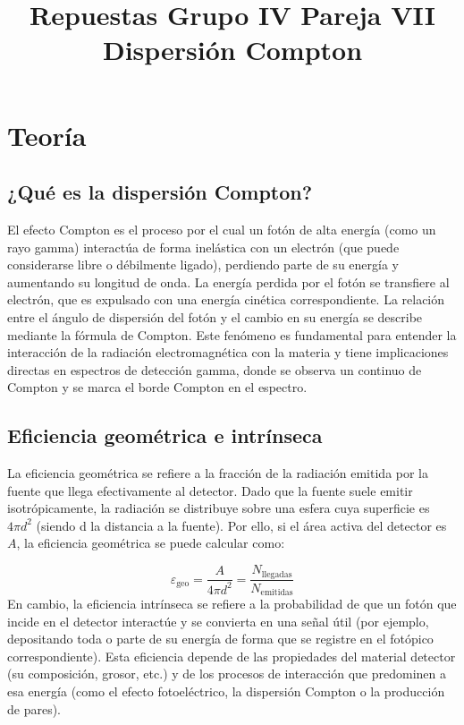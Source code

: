 \documentclass[11pt]{article}
\title{Repuestas Grupo IV Pareja VII Dispersión Compton}
\begin{document}
	
\maketitle
\tableofcontents

\setlength{\parskip}{1.5mm} %

\newpage




\section{Teoría}

\subsection{¿Qué es la dispersión Compton?}

El efecto Compton es el proceso por el cual un fotón de alta energía (como un rayo gamma) interactúa de forma inelástica con un electrón (que puede considerarse libre o débilmente ligado), perdiendo parte de su energía y aumentando su longitud de onda. La energía perdida por el fotón se transfiere al electrón, que es expulsado con una energía cinética correspondiente. La relación entre el ángulo de dispersión del fotón y el cambio en su energía se describe mediante la fórmula de Compton. Este fenómeno es fundamental para entender la interacción de la radiación electromagnética con la materia y tiene implicaciones directas en espectros de detección gamma, donde se observa un continuo de Compton y se marca el borde Compton en el espectro.

\subsection{Eficiencia geométrica e intrínseca}
La eficiencia geométrica se refiere a la fracción de la radiación emitida por la fuente que llega efectivamente al detector. Dado que la fuente suele emitir isotrópicamente, la radiación se distribuye sobre una esfera cuya superficie es $4\pi d^2$ (siendo d la distancia a la fuente). Por ello, si el área activa del detector es $A$, la eficiencia geométrica se puede calcular como:

\begin{equation}
    \varepsilon_{\text{geo}} = \frac{A}{4\pi d^2} = \frac{N_{\text{llegadas}}}{N_{\text{emitidas}}}
\end{equation}
En cambio, la eficiencia intrínseca se refiere a la probabilidad de que un fotón que incide en el detector interactúe y se convierta en una señal útil (por ejemplo, depositando toda o parte de su energía de forma que se registre en el fotópico correspondiente). Esta eficiencia depende de las propiedades del material detector (su composición, grosor, etc.) y de los procesos de interacción que predominen a esa energía (como el efecto fotoeléctrico, la dispersión Compton o la producción de pares).
\end{document}
